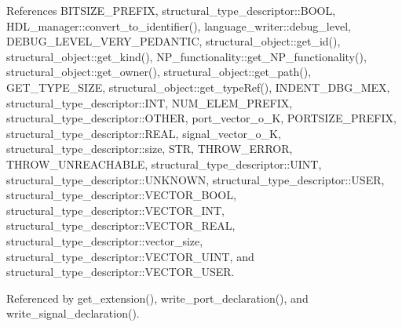 References B\+I\+T\+S\+I\+Z\+E\+\_\+\+P\+R\+E\+F\+IX, structural\+\_\+type\+\_\+descriptor\+::\+B\+O\+OL, H\+D\+L\+\_\+manager\+::convert\+\_\+to\+\_\+identifier(), language\+\_\+writer\+::debug\+\_\+level, D\+E\+B\+U\+G\+\_\+\+L\+E\+V\+E\+L\+\_\+\+V\+E\+R\+Y\+\_\+\+P\+E\+D\+A\+N\+T\+IC, structural\+\_\+object\+::get\+\_\+id(), structural\+\_\+object\+::get\+\_\+kind(), N\+P\+\_\+functionality\+::get\+\_\+\+N\+P\+\_\+functionality(), structural\+\_\+object\+::get\+\_\+owner(), structural\+\_\+object\+::get\+\_\+path(), G\+E\+T\+\_\+\+T\+Y\+P\+E\+\_\+\+S\+I\+ZE, structural\+\_\+object\+::get\+\_\+type\+Ref(), I\+N\+D\+E\+N\+T\+\_\+\+D\+B\+G\+\_\+\+M\+EX, structural\+\_\+type\+\_\+descriptor\+::\+I\+NT, N\+U\+M\+\_\+\+E\+L\+E\+M\+\_\+\+P\+R\+E\+F\+IX, structural\+\_\+type\+\_\+descriptor\+::\+O\+T\+H\+ER, port\+\_\+vector\+\_\+o\+\_\+K, P\+O\+R\+T\+S\+I\+Z\+E\+\_\+\+P\+R\+E\+F\+IX, structural\+\_\+type\+\_\+descriptor\+::\+R\+E\+AL, signal\+\_\+vector\+\_\+o\+\_\+K, structural\+\_\+type\+\_\+descriptor\+::size, S\+TR, T\+H\+R\+O\+W\+\_\+\+E\+R\+R\+OR, T\+H\+R\+O\+W\+\_\+\+U\+N\+R\+E\+A\+C\+H\+A\+B\+LE, structural\+\_\+type\+\_\+descriptor\+::\+U\+I\+NT, structural\+\_\+type\+\_\+descriptor\+::\+U\+N\+K\+N\+O\+WN, structural\+\_\+type\+\_\+descriptor\+::\+U\+S\+ER, structural\+\_\+type\+\_\+descriptor\+::\+V\+E\+C\+T\+O\+R\+\_\+\+B\+O\+OL, structural\+\_\+type\+\_\+descriptor\+::\+V\+E\+C\+T\+O\+R\+\_\+\+I\+NT, structural\+\_\+type\+\_\+descriptor\+::\+V\+E\+C\+T\+O\+R\+\_\+\+R\+E\+AL, structural\+\_\+type\+\_\+descriptor\+::vector\+\_\+size, structural\+\_\+type\+\_\+descriptor\+::\+V\+E\+C\+T\+O\+R\+\_\+\+U\+I\+NT, and structural\+\_\+type\+\_\+descriptor\+::\+V\+E\+C\+T\+O\+R\+\_\+\+U\+S\+ER.



Referenced by get\+\_\+extension(), write\+\_\+port\+\_\+declaration(), and write\+\_\+signal\+\_\+declaration().

